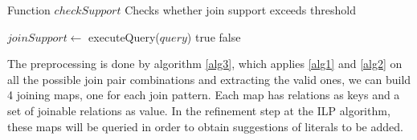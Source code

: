 \begin{algorithm}[!h]
  \caption{Function $checkSupport$ \newline Checks whether join support exceeds threshold}
  \label{alg2}
     {
    }
    $joinSupport \leftarrow$ executeQuery($query$)\;
      {
      \Return true\;
    }{
      \Return false\;
    }
\end{algorithm}


The preprocessing is done by algorithm \ref{alg3}, which applies \ref{alg1} and \ref{alg2} on all the possible join pair
combinations and extracting the valid ones, we can build 4 joining maps, one for each join pattern. Each map has
relations as keys and a set of joinable relations as value. In the refinement step at the ILP algorithm, these maps will
be queried in order to obtain suggestions of literals to be
added.

